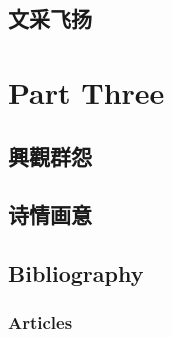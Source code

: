 \documentclass[11pt,fleqn]{book} %
\begin{document}


\chapter{ 文采飞扬}






\part{Part Three}




\chapter{ 興觀群怨}





\chapter{ 诗情画意}





\chapter*{Bibliography}


\section*{Articles}
\end{document}
